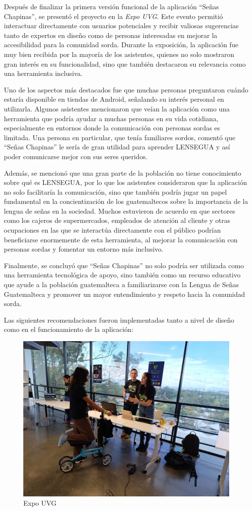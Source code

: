 Después de finalizar la primera versión funcional de la aplicación ``Señas Chapinas'', se presentó el proyecto en la \textit{Expo UVG}. Este evento permitió interactuar directamente con usuarios potenciales y recibir valiosas sugerencias tanto de expertos en diseño como de personas interesadas en mejorar la accesibilidad para la comunidad sorda. Durante la exposición, la aplicación fue muy bien recibida por la mayoría de los asistentes, quienes no solo mostraron gran interés en su funcionalidad, sino que también destacaron su relevancia como una herramienta inclusiva.

Uno de los aspectos más destacados fue que muchas personas preguntaron cuándo estaría disponible en tiendas de Android, señalando su interés personal en utilizarla. Algunos asistentes mencionaron que veían la aplicación como una herramienta que podría ayudar a muchas personas en su vida cotidiana, especialmente en entornos donde la comunicación con personas sordas es limitada. Una persona en particular, que tenía familiares sordos, comentó que ``Señas Chapinas'' le sería de gran utilidad para aprender LENSEGUA y así poder comunicarse mejor con sus seres queridos.

Además, se mencionó que una gran parte de la población no tiene conocimiento sobre qué es LENSEGUA, por lo que los asistentes consideraron que la aplicación no solo facilitaría la comunicación, sino que también podría jugar un papel fundamental en la concientización de los guatemaltecos sobre la importancia de la lengua de señas en la sociedad. Muchos estuvieron de acuerdo en que sectores como los cajeros de supermercados, empleados de atención al cliente y otras ocupaciones en las que se interactúa directamente con el público podrían beneficiarse enormemente de esta herramienta, al mejorar la comunicación con personas sordas y fomentar un entorno más inclusivo.

Finalmente, se concluyó que ``Señas Chapinas'' no solo podría ser utilizada como una herramienta tecnológica de apoyo, sino también como un recurso educativo que ayude a la población guatemalteca a familiarizarse con la Lengua de Señas Guatemalteca y promover un mayor entendimiento y respeto hacia la comunidad sorda.

Las siguientes recomendaciones fueron implementadas tanto a nivel de diseño como en el funcionamiento de la aplicación:

\begin{figure} [H]
    \centering
    \includegraphics[width=0.5\linewidth]{figuras/expo.jpeg}
    \caption{Expo UVG}
    \label{fig:enter-label}
\end{figure}

